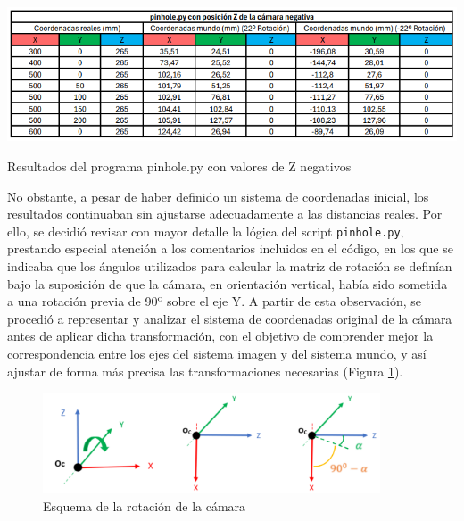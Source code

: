   
  \begin{table}[H]
   \centering
   \begin{center}
     \includegraphics[width=150mm]{figs/pinhole con Z negativa.png}
   \end{center}
   \caption{Resultados del programa pinhole.py con valores de Z negativos}
   \label{tab:pinhole_Zneg}
  \end{table}

No obstante, a pesar de haber definido un sistema de coordenadas inicial, los resultados continuaban sin ajustarse adecuadamente a las distancias reales. Por ello, se decidió revisar con mayor detalle la lógica del script \verb|pinhole.py|, prestando especial atención a los comentarios incluidos en el código, en los que se indicaba que los ángulos utilizados para calcular la matriz de rotación se definían bajo la suposición de que la cámara, en orientación vertical, había sido sometida a una rotación previa de 90º sobre el eje Y. A partir de esta observación, se procedió a representar y analizar el sistema de coordenadas original de la cámara antes de aplicar dicha transformación, con el objetivo de comprender mejor la correspondencia entre los ejes del sistema imagen y del sistema mundo, y así ajustar de forma más precisa las transformaciones necesarias (Figura \ref{fig:esquema_rot_camara}). 

  \begin{figure}[H]
     \centering
     \begin{center}
       \includegraphics[width=100mm]{figs/Esquema rotación cámara.png}
     \end{center}
     \caption{Esquema de la rotación de la cámara}
    \label{fig:esquema_rot_camara}
  \end{figure}

